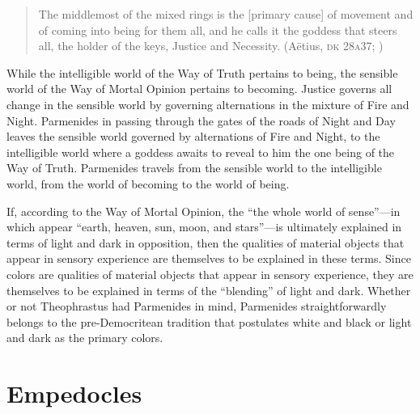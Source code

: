 \begin{quote}
	The middlemost of the mixed rings is the [primary cause] of movement and of coming into being for them all, and he calls it the goddess that steers all, the holder of the keys, Justice and Necessity. (Aëtius, \textsc{dk} 28\textsc{a}37; \citealt[151]{McKirahan:1994ve})
\end{quote}
While the intelligible world of the Way of Truth pertains to being, the sensible world of the Way of Mortal Opinion pertains to becoming. Justice governs all change in the sensible world by governing alternations in the mixture of Fire and Night. Parmenides in passing through the gates of the roads of Night and Day leaves the sensible world governed by alternations of Fire and Night, to the intelligible world where a goddess awaits to reveal to him the one being of the Way of Truth. Parmenides travels from the sensible world to the intelligible world, from the world of becoming to the world of being.

If, according to the Way of Mortal Opinion, the ``the whole world of sense''---in which appear ``earth, heaven, sun, moon, and stars''---is ultimately explained in terms of light and dark in opposition, then the qualities of material objects that appear in sensory experience are themselves to be explained in these terms. Since colors are qualities of material objects that appear in sensory experience, they are themselves to be explained in terms of the ``blending'' of light and dark. Whether or not Theophrastus had Parmenides in mind, Parmenides straightforwardly belongs to the pre-Democritean tradition that postulates white and black or light and dark as the primary colors.


\section{Empedocles} %
\label{sec:empedocles}

